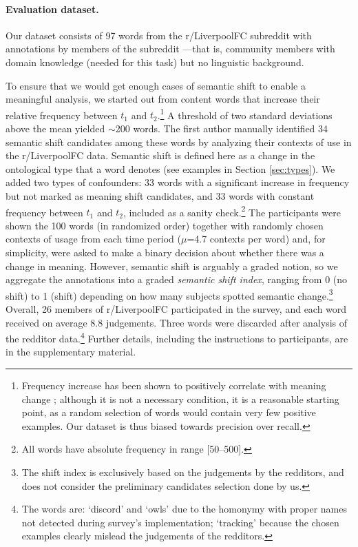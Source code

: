 

\paragraph{Evaluation dataset.}

Our dataset consists of 97 words from the r/LiverpoolFC subreddit with
annotations by members of the subreddit ---that is, community members
with domain knowledge (needed for this task) but no linguistic
background.

To ensure that we would get enough cases of semantic shift to enable a
meaningful analysis, we started out from content words that increase
their relative frequency between $t_1$ and $t_2$.\footnote{Frequency
  increase has been shown to positively correlate with meaning change
  \cite{wijaya2011understanding,kulkarni2015statistically}; although
  it is not a necessary condition, it is a reasonable starting point,
  as a random selection of words would contain very few positive
  examples. Our dataset is thus biased towards precision over recall.}
A threshold of two standard deviations above the mean yielded
$\sim$200 words. The first author manually identified 34 semantic
shift candidates among these words by analyzing their contexts of use
in the r/LiverpoolFC data.  Semantic shift is defined here as a change
in the ontological type that a word denotes (see examples in
Section \ref{sec:types}). We added two types of confounders: 33 words
with a significant increase in frequency but not marked as meaning
shift candidates, and 33 words with constant frequency between $t_1$
and $t_2$, included as a sanity check.\footnote{All words have
  absolute frequency in range [50--500].}
The participants were shown the 100 words (in randomized order) together with randomly chosen contexts of usage from each time period ($\mu$=4.7 contexts per word) and, for simplicity, were asked to make a binary decision
about whether there was a change in meaning. However, semantic shift
is arguably a graded notion, so we aggregate the annotations into a
graded \emph{semantic shift index}, ranging from 0 (no shift) to 1
(shift) depending on how many subjects spotted semantic
change.\footnote{The shift index is exclusively based on the
  judgements by the redditors, and does not consider the preliminary
  candidates selection done by us.}  Overall, 26 members of
r/LiverpoolFC participated in the survey, and each word received on
average 8.8 judgements. Three words were discarded after analysis of
the redditor data.\footnote{The words are: `discord'  and `owls' due to the homonymy with proper names not detected during survey's implementation; `tracking' because the chosen examples clearly mislead the judgements of the redditors.} 
Further details, including the instructions to participants, are in
the supplementary material.



